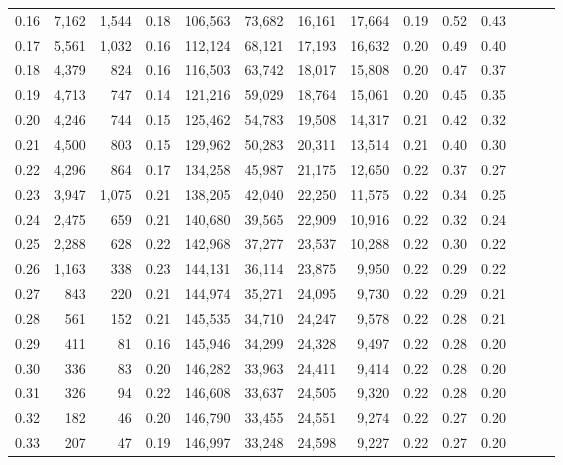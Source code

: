 \begin{tabular}{rrrrrrrrrrrrrr}
0.16 &   7,162 &  1,544 &  0.18 &  106,563 &   73,682 &  16,161 &  17,664 &  0.19 &  0.52 &      0.43 \\
0.17 &   5,561 &  1,032 &  0.16 &  112,124 &   68,121 &  17,193 &  16,632 &  0.20 &  0.49 &      0.40 \\
0.18 &   4,379 &    824 &  0.16 &  116,503 &   63,742 &  18,017 &  15,808 &  0.20 &  0.47 &      0.37 \\
0.19 &   4,713 &    747 &  0.14 &  121,216 &   59,029 &  18,764 &  15,061 &  0.20 &  0.45 &      0.35 \\
0.20 &   4,246 &    744 &  0.15 &  125,462 &   54,783 &  19,508 &  14,317 &  0.21 &  0.42 &      0.32 \\
0.21 &   4,500 &    803 &  0.15 &  129,962 &   50,283 &  20,311 &  13,514 &  0.21 &  0.40 &      0.30 \\
0.22 &   4,296 &    864 &  0.17 &  134,258 &   45,987 &  21,175 &  12,650 &  0.22 &  0.37 &      0.27 \\
0.23 &   3,947 &  1,075 &  0.21 &  138,205 &   42,040 &  22,250 &  11,575 &  0.22 &  0.34 &      0.25 \\
0.24 &   2,475 &    659 &  0.21 &  140,680 &   39,565 &  22,909 &  10,916 &  0.22 &  0.32 &      0.24 \\
0.25 &   2,288 &    628 &  0.22 &  142,968 &   37,277 &  23,537 &  10,288 &  0.22 &  0.30 &      0.22 \\
0.26 &   1,163 &    338 &  0.23 &  144,131 &   36,114 &  23,875 &   9,950 &  0.22 &  0.29 &      0.22 \\
0.27 &     843 &    220 &  0.21 &  144,974 &   35,271 &  24,095 &   9,730 &  0.22 &  0.29 &      0.21 \\
0.28 &     561 &    152 &  0.21 &  145,535 &   34,710 &  24,247 &   9,578 &  0.22 &  0.28 &      0.21 \\
0.29 &     411 &     81 &  0.16 &  145,946 &   34,299 &  24,328 &   9,497 &  0.22 &  0.28 &      0.20 \\
0.30 &     336 &     83 &  0.20 &  146,282 &   33,963 &  24,411 &   9,414 &  0.22 &  0.28 &      0.20 \\
0.31 &     326 &     94 &  0.22 &  146,608 &   33,637 &  24,505 &   9,320 &  0.22 &  0.28 &      0.20 \\
0.32 &     182 &     46 &  0.20 &  146,790 &   33,455 &  24,551 &   9,274 &  0.22 &  0.27 &      0.20 \\
0.33 &     207 &     47 &  0.19 &  146,997 &   33,248 &  24,598 &   9,227 &  0.22 &  0.27 &      0.20 \\

\end{tabular}
